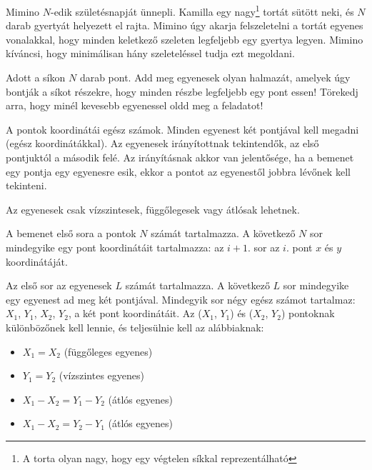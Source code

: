 





Mimino $N$-edik születésnapját ünnepli. Kamilla egy nagy\footnote{A torta olyan nagy, hogy egy végtelen síkkal reprezentálható} tortát sütött neki, és $N$ darab gyertyát helyezett el rajta. Mimino úgy akarja felszeletelni a tortát egyenes vonalakkal, hogy minden keletkező szeleten legfeljebb egy gyertya legyen. Mimino kíváncsi, hogy minimálisan hány szeleteléssel tudja ezt megoldani.



Adott a síkon $N$ darab pont. Add meg egyenesek olyan halmazát, amelyek úgy bontják a síkot részekre, hogy minden részbe legfeljebb egy pont essen! Törekedj arra, hogy minél kevesebb egyenessel oldd meg a feladatot!

A pontok koordinátái egész számok. Minden egyenest két pontjával kell megadni (egész koordinátákkal). Az egyenesek irányítottnak tekintendők, az első pontjuktól a második felé. Az irányításnak akkor van jelentősége, ha a bemenet egy pontja egy egyenesre esik, ekkor a pontot az egyenestől jobbra lévőnek kell tekinteni.

Az egyenesek csak vízszintesek, függőlegesek vagy átlósak lehetnek.


A bemenet első sora a pontok $N$ számát tartalmazza. A következő $N$ sor mindegyike egy pont koordinátáit tartalmazza: az $i+1$. sor az $i$. pont $x$ és $y$ koordinátáját.


Az első sor az egyenesek $L$ számát tartalmazza. A következő $L$ sor mindegyike egy egyenest ad meg két pontjával. Mindegyik sor négy egész számot tartalmaz: $X_1$, $Y_1$, $X_2$, $Y_2$, a két pont koordinátáit. Az ($X_1$, $Y_1$) és ($X_2$, $Y_2$) pontoknak különbözőnek kell lennie, és teljesülnie kell az alábbiaknak:

\begin{itemize}
  \item $X_1 = X_2$ (függőleges egyenes)
  \item $Y_1 = Y_2$ (vízszintes egyenes)
  \item $X_1 - X_2 = Y_1 - Y_2$ (átlós egyenes)
  \item $X_1 - X_2 = Y_2 - Y_1$ (átlós egyenes)
\end{itemize}

